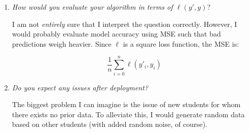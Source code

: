 \begin{enumerate}
  \item \textit{How would you evaluate your algorithm in terms of $\ell(y', y)$}?

    I am not \textit{entirely} sure that I interpret the question correctly.
    However, I would probably evaluate model accuracy using MSE such that bad
    predictions weigh heavier. Since $\ell$ is a square loss function, the MSE
    is:

    $$
    \frac{1}{n}\sum_{i = 0}^n \ell(y'_i, y_i)
    $$


  \item \textit{Do you expect any issues after deployment?}

    The biggest problem I can imagine is the issue of new students for whom
    there exists no prior data. To alleviate this, I would generate random data
    based on other students (with added random noise, of course).

\end{enumerate}

\sectend

